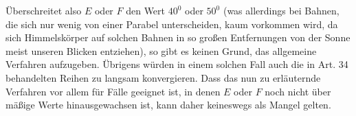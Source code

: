 \noindent Überschreitet also $E$ oder $F$ den Wert $40^0$ oder $50^0$ (was allerdings bei Bahnen, die sich nur wenig von einer Parabel unterscheiden, kaum vorkommen wird, da sich Himmelskörper auf solchen Bahnen in so großen Entfernungen von der Sonne meist unseren Blicken entziehen), so gibt es keinen Grund, das allgemeine Verfahren aufzugeben. Übrigens würden in einem solchen Fall auch die in Art. 34 behandelten Reihen zu langsam konvergieren. Dass das nun zu erläuternde Verfahren vor allem für Fälle geeignet ist, in denen $E$ oder $F$ noch nicht über mäßige Werte hinausgewachsen ist, kann daher keineswegs als Mangel gelten.
